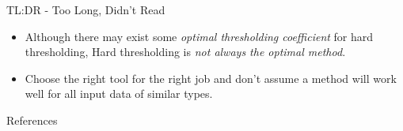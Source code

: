 \documentclass[aspectratio=169,xcolor=dvipsnames]{beamer}
\begin{document}
	
	\begin{frame}{TL:DR - Too Long, Didn't Read}
		\begin{itemize}
			\item Although there may exist some \textit{optimal thresholding coefficient} for hard thresholding, Hard thresholding is \textit{not always the optimal method}.
			\item Choose the right tool for the right job and don't assume a method will work well for all input data of similar types.
		\end{itemize}
	\end{frame}	
		
	
	\begin{frame}{References}
		\printbibliography
	\end{frame}
	

	
	
	
\end{document}
